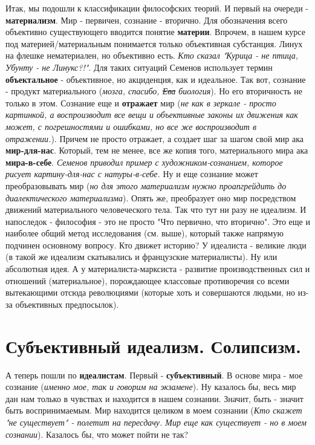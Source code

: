 Итак, мы подошли к классификации философских теорий. И первый на очереди - \textbf{материализм}. Мир - первичен, сознание - вторично. Для обозначения всего объективно существующего вводится понятие \textbf{материи}. Впрочем, в нашем курсе под материей/материальным понимается только объективная субстанция. Линух на флешке нематериален, но объективно есть. \textit{Кто сказал "Курица - не птица, Убунту - не Линукс?!"}. Для таких ситуаций Семенов использует термин \textbf{объектальное} - объективное, но акциденция, как и идеальное. Так вот, сознание - продукт материального (\textit{мозга, спасибо, \sout{Ева} биология}). Но его вторичность не только в этом. Сознание еще и \textbf{отражает} мир (\textit{не как в зеркале - просто картинкой, а воспроизводит все вещи и объективные законы их движения как может, с погрешностями и ошибками, но все же воспроизводит в отражении.}). Причем не просто отражает, а создает шаг за шагом свой мир ака \textbf{мир-для-нас}. Который, тем не менее, все же копия того, материального мира ака \textbf{мира-в-себе}. \textit{Семенов приводил пример с художником-сознанием, которое рисует картину-для-нас с натуры-в-себе.} Ну и еще сознание
может преобразовывать мир (\textit{но для этого материализм нужно проапгрейдить до диалектического материализма}). Опять же, преобразует оно мир посредством движений материального человеческого тела. Так что тут ни разу не идеализм. И напоследок - философия - это не просто "Что первично, что вторично". Это еще и наиболее общий метод исследования (см. выше), который также напрямую подчинен основному вопросу. Кто движет историю? У идеалиста - великие люди (в такой же идеализм скатывались и французские материалисты). Ну или абсолютная идея. А у материалиста-марксиста - развитие производственных сил и отношений (материальное), порождающее классовые противоречия со всеми вытекающими отсюда революциями (которые хоть и совершаются людьми, но из-за объективных предпосылок). 

\section{ Субъективный идеализм. Солипсизм.}
А теперь пошли по \textbf{идеалистам}. Первый - \textbf{субъективный}. В основе мира - мое сознание (\textit{именно мое, так и говорим на экзамене}). Ну казалось бы, весь мир дан нам только в чувствах и находится в нашем сознании. Значит, быть - значит быть воспринимаемым. Мир находится целиком в моем сознании (\textit{Кто скажет "не существует" - полетит на пересдачу. Мир еще как существует - но в моем сознании}). Казалось бы, что может пойти не так? 

